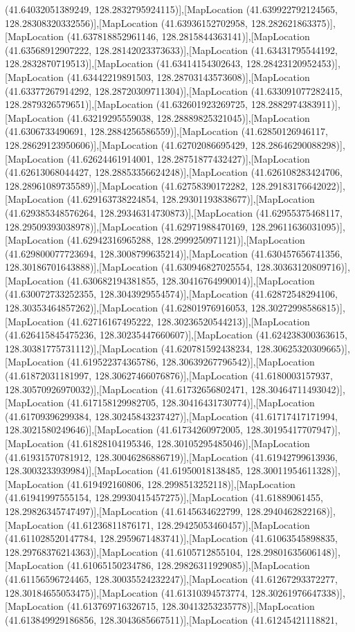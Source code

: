 (41.64032051389249, 128.2832795924115)],[MapLocation (41.639922792124565, 128.28308320332556)],[MapLocation (41.63936152702958, 128.282621863375)],[MapLocation (41.637818852961146, 128.2815844363141)],[MapLocation (41.63568912907222, 128.28142023373633)],[MapLocation (41.63431795544192, 128.2832870719513)],[MapLocation (41.63414154302643, 128.28423120952453)],[MapLocation (41.63442219891503, 128.28703143573608)],[MapLocation (41.63377267914292, 128.28720309711304)],[MapLocation (41.633091077282415, 128.2879326579651)],[MapLocation (41.632601923269725, 128.2882974383911)],[MapLocation (41.63219295559038, 128.28889825321045)],[MapLocation (41.6306733490691, 128.2884256586559)],[MapLocation (41.62850126946117, 128.28629123950606)],[MapLocation (41.62702086695429, 128.28646290088298)],[MapLocation (41.62624461914001, 128.28751877432427)],[MapLocation (41.62613068044427, 128.28853356624248)],[MapLocation (41.626108283424706, 128.28961089735589)],[MapLocation (41.62758390172282, 128.29183176642022)],[MapLocation (41.629163738224854, 128.29301193838677)],[MapLocation (41.629385348576264, 128.29346314730873)],[MapLocation (41.62955375468117, 128.29509393038978)],[MapLocation (41.62971988470169, 128.29611636031095)],[MapLocation (41.62942316965288, 128.2999250971121)],[MapLocation (41.629800077723694, 128.3008799635214)],[MapLocation (41.630457656741356, 128.30186701643888)],[MapLocation (41.630946827025554, 128.30363120809716)],[MapLocation (41.630682194381855, 128.30416764990014)],[MapLocation (41.630072733252355, 128.3043929554574)],[MapLocation (41.62872548294106, 128.30353464857262)],[MapLocation (41.62801976916053, 128.30272998586815)],[MapLocation (41.62716167495222, 128.30236520544213)],[MapLocation (41.626415845475236, 128.30235447660607)],[MapLocation (41.624238300363615, 128.30381775731112)],[MapLocation (41.620781592438234, 128.30625320309665)],[MapLocation (41.619522374365786, 128.30639267796542)],[MapLocation (41.61872031181997, 128.30627466076876)],[MapLocation (41.6180003157937, 128.30570926970032)],[MapLocation (41.61732656802471, 128.30464711493042)],[MapLocation (41.617158129982705, 128.30416431730774)],[MapLocation (41.61709396299384, 128.30245843237427)],[MapLocation (41.61717417171994, 128.3021580249646)],[MapLocation (41.61734260972005, 128.30195417707947)],[MapLocation (41.61828104195346, 128.30105295485046)],[MapLocation (41.61931570781912, 128.30046286886719)],[MapLocation (41.61942799613936, 128.3003233939984)],[MapLocation (41.61950018138485, 128.30011954611328)],[MapLocation (41.619492160806, 128.2998513252118)],[MapLocation (41.61941997555154, 128.29930415457275)],[MapLocation (41.61889061455, 128.29826345747497)],[MapLocation (41.6145634622799, 128.2940462822168)],[MapLocation (41.61236811876171, 128.29425053460457)],[MapLocation (41.611028520147784, 128.2959671483741)],[MapLocation (41.61063545898835, 128.29768376214363)],[MapLocation (41.6105712855104, 128.29801635606148)],[MapLocation (41.61065150234786, 128.29826311929085)],[MapLocation (41.61156596724465, 128.30035524232247)],[MapLocation (41.61267293372277, 128.30184655053475)],[MapLocation (41.61310394573774, 128.30261976647338)],[MapLocation (41.613769716326715, 128.30413253235778)],[MapLocation (41.613849929186856, 128.3043685667511)],[MapLocation (41.61245421118821, 